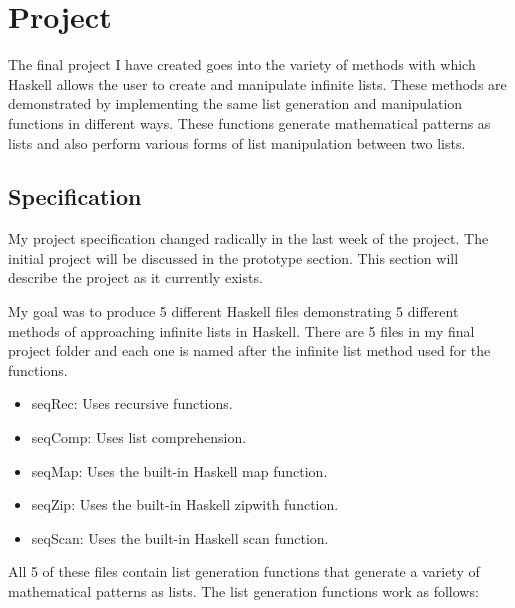 \documentclass{article}
\theoremstyle{theorem}
\theoremstyle{definition}
\theoremstyle{remark}
\begin{document}
\section{Project}

The final project I have created goes into the variety of methods with which Haskell allows the user to create and manipulate infinite lists. These methods are demonstrated by implementing the same list generation and manipulation functions in different ways. These functions generate mathematical patterns as lists and also perform various forms of list manipulation between two lists.

\subsection{Specification}
My project specification changed radically in the last week of the project. The initial project will be discussed in the prototype section. This section will describe the project as it currently exists.

\medskip\noindent
My goal was to produce 5 different Haskell files demonstrating 5 different methods of approaching infinite lists in Haskell. There are 5 files in my final project folder and each one is named after the infinite list method used for the functions.

\begin {itemize}
\item seqRec: Uses recursive functions.
\item seqComp: Uses list comprehension.
\item seqMap: Uses the built-in Haskell map function.
\item seqZip: Uses the built-in Haskell zipwith function.
\item seqScan: Uses the built-in Haskell scan function.
\end {itemize}
%
All 5 of these files contain list generation functions that generate a variety of mathematical patterns as lists. The list generation functions work as follows:
\end{document}
